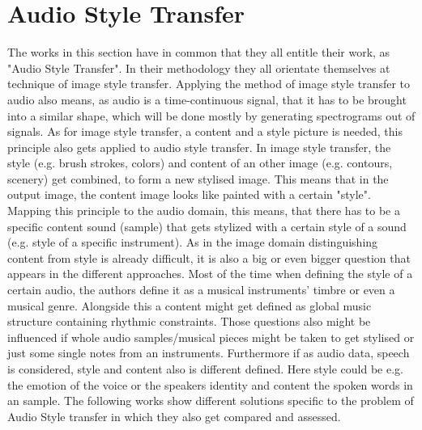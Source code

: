 \section{Audio Style Transfer}
\label{sec:rw_audio_style_transfer}
The works in this section have in common that they all entitle their work, as "Audio Style Transfer". In their methodology they all orientate themselves at technique of image style transfer. Applying the method of image style transfer to audio also means, as audio is a time-continuous signal, that it has to be brought into a similar shape, which will be done mostly by generating spectrograms out of signals. As for image style transfer, a content and a style picture is needed, this principle also gets applied to audio style transfer. In image style transfer, the style (e.g. brush strokes, colors) and content of an other image (e.g. contours, scenery) get combined, to form a new stylised image. \cite{Gatys2016} This means that in the output image, the content image looks like painted with a certain "style". Mapping this principle to the audio domain, this means, that there has to be a specific content sound (sample) that gets stylized with a certain style of a sound (e.g. style of a specific instrument). As in the image domain distinguishing content from style is already difficult, it is also a big or even bigger question that appears in the different approaches. Most of the time when defining the style of a certain audio, the authors define it as a musical instruments' timbre or even a musical genre. Alongside this a content might get defined as global music structure containing rhythmic constraints. \cite{Grinstein2018} Those questions also might be influenced if whole audio samples/musical pieces might be taken to get stylised or just some single notes from an instruments. Furthermore if as audio data, speech is considered, style and content also is different defined. Here style could be e.g. the emotion of the voice or the speakers identity and content the spoken words in an sample. The following works show different solutions specific to the problem of Audio Style transfer in which they also get compared and assessed. \\

